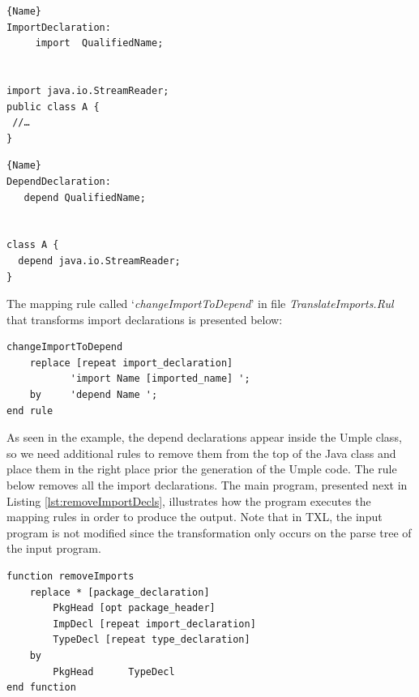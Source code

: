 \noindent\begin{minipage}{.45\textwidth}
\begin{lstlisting}[style=umplePlain,caption=Java import]{Name}
ImportDeclaration:
     import  QualifiedName; 


import java.io.StreamReader;
public class A {
 //…
}
\end{lstlisting}
\end{minipage}\hfill
\begin{minipage}{.45\textwidth}
\begin{lstlisting}[style=umplePlain,caption=Umple depend]{Name}
DependDeclaration:
   depend QualifiedName;


class A {
  depend java.io.StreamReader;
}
\end{lstlisting}
\end{minipage}

The mapping rule called `\textit{changeImportToDepend}' in file \textit{TranslateImports.Rul} that transforms import declarations is presented below: 

\begin{lstlisting}[style=umplePlain, label=lst:packageDeclRule, caption=TXL mapping rule for the transformation of the import declaration] 
changeImportToDepend  	
    replace [repeat import_declaration]      
           'import Name [imported_name] '; 
    by 	   'depend Name '; 
end rule
\end{lstlisting}

As seen in the example, the depend declarations appear inside the Umple class, so we need additional rules to remove them from the top of the Java class and place them in the right place prior the generation of the Umple code. The rule below removes all the import declarations. The main program, presented next in Listing \ref{lst:removeImportDecls}, illustrates how the program executes the mapping rules in order to produce the output. Note that in TXL, the input program is not modified since the transformation only occurs on the parse tree of the input program.

\begin{lstlisting}[style=umplePlain, label=lst:removeImportDecls, caption=Helper function used to remove the imports declarations] 
function removeImports  
    replace * [package_declaration]
        PkgHead [opt package_header]   
        ImpDecl [repeat import_declaration]  
        TypeDecl [repeat type_declaration] 
    by   
        PkgHead      TypeDecl
end function
\end{lstlisting}


